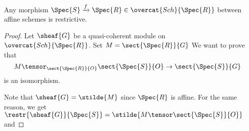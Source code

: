 \begin{lemma}
Any morphism $\Spec{S} \xrightarrow{f} \Spec{R} \in \overcat{Sch}{\Spec{R}}$ 
between affine schemes is restrictive.
\end{lemma}
\begin{proof}

Let $\sheaf{G}$ be a quasi-coherent module on $\overcat{Sch}{\Spec{R}}$.
Set $M = \sect{\Spec{R}}{G}$
We want to prove that 
\[
M \tensor_{\sect{\Spec{R}}{O}} \sect{\Spec{S}}{O} \rightarrow \sect{\Spec{S}}{G}
\]
is an isomorphism.

Note that $\sheaf{G} = \stilde{M}$ since $\Spec{R}$ is affine. %
For the same reason, we get $\restr{\sheaf{G}}{\Spec{S}} = \stilde{M \tensor \sect{\Spec{S}}{O}}$
and 
\end{proof}